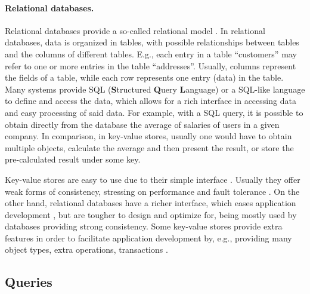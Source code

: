 \paragraph{Relational databases.}
Relational databases provide a so-called relational model \cite{spanner, eiger, noria}. %
In relational databases, data is organized in tables, with possible relationships between tables and the columns of different tables.
E.g., each entry in a table ``customers'' may refer to one or more entries in the table ``addresses''.
Usually, columns represent the fields of a table, while each row represents one entry (data) in the table.
Many systems provide SQL (\textbf{S}tructured \textbf{Q}uery \textbf{L}anguage) or a SQL-like language \cite{sequel, spanner, noria, mongoVScassandra} to define and access the data, which allows for a rich interface in accessing data and easy processing of said data.
For example, with a SQL query, it is possible to obtain directly from the database the average of salaries of users in a given company.
In comparison, in key-value stores, usually one would have to obtain multiple objects, calculate the average and then present the result, or store the pre-calculated result under some key.

Key-value stores are easy to use due to their simple interface \cite{dynamo}. 
Usually they offer weak forms of consistency, stressing on performance and fault tolerance \cite{dynamo, cops, cure}.
On the other hand, relational databases have a richer interface, which eases application development \cite{spanner, noria, eiger}, but are tougher to design and optimize for, being mostly used by databases providing strong consistency.
Some key-value stores provide extra features in order to facilitate application development by, e.g., providing many object types, extra operations, transactions \cite{cure, walter}.

\subsection{Queries}


